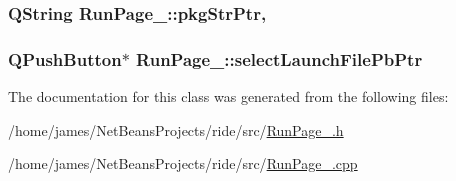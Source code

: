 \hypertarget{class_run_page__2_a3cb53dcb4a7355f093c49485c0e72b6c}{
\subsubsection[{pkg\-Str\-Ptr}]{\setlength{\rightskip}{0pt plus 5cm}Q\-String Run\-Page\-\_\-::pkg\-Str\-Ptr\hspace{0.3cm}{\ttfamily [static]}, {\ttfamily [private]}}}\label{class_run_page__2_a3cb53dcb4a7355f093c49485c0e72b6c}
\hypertarget{class_run_page__2_a63aea1b3e5cb510e54893adc80bd4852}{
\subsubsection[{select\-Launch\-File\-Pb\-Ptr}]{\setlength{\rightskip}{0pt plus 5cm}Q\-Push\-Button$\ast$ Run\-Page\-\_\-::select\-Launch\-File\-Pb\-Ptr\hspace{0.3cm}{\ttfamily [private]}}}\label{class_run_page__2_a63aea1b3e5cb510e54893adc80bd4852}


The documentation for this class was generated from the following files\-:\begin{DoxyCompactItemize}
\item 
/home/james/\-Net\-Beans\-Projects/ride/src/\hyperlink{_run_page__2_8h}{Run\-Page\-\_.\-h}\item 
/home/james/\-Net\-Beans\-Projects/ride/src/\hyperlink{_run_page__2_8cpp}{Run\-Page\-\_.\-cpp}\end{DoxyCompactItemize}
